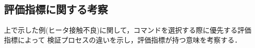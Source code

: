 \documentclass[11pt]{jsreport}
\begin{document}
\subsection{評価指標に関する考察}
上で示した例(ヒータ接触不良)に関して，コマンドを選択する際に優先する評価指標によって
検証プロセスの違いを示し，評価指標が持つ意味を考察する．

\end{document}
